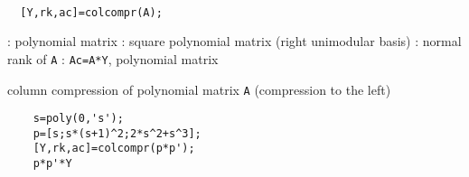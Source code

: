 
\begin{mandesc}
   \\ %
\end{mandesc}
\begin{calling_sequence}
\begin{verbatim}
  [Y,rk,ac]=colcompr(A);  
\end{verbatim}
\end{calling_sequence}
\begin{parameters}
  \begin{varlist}
    : polynomial matrix
    : square polynomial matrix (right unimodular basis)
    : normal rank of \verb!A!
    : \verb!Ac=A*Y!, polynomial matrix
  \end{varlist}
\end{parameters}
\begin{mandescription}
  column compression of polynomial matrix \verb!A! (compression to the left)
\end{mandescription}
\begin{examples}
  \begin{Verbatim}
    s=poly(0,'s');
    p=[s;s*(s+1)^2;2*s^2+s^3];
    [Y,rk,ac]=colcompr(p*p');
    p*p'*Y
  \end{Verbatim}
\end{examples}
\begin{manseealso}
\end{manseealso}
